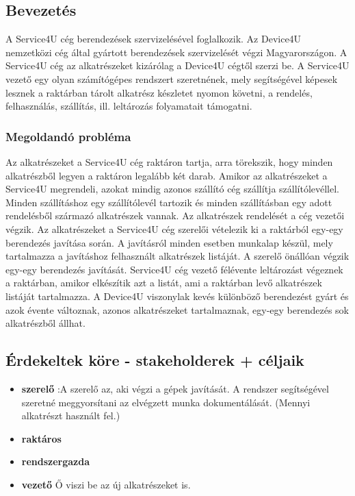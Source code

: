 \documentclass[11pt]{article}\usepackage[left=20mm,right=20mm,top=15mm,bottom=20mm]{geometry}
\begin{document}
\subsection{Bevezetés}
A Service4U cég berendezések szervizelésével foglalkozik. Az Device4U nemzetközi cég által
gyártott berendezések szervizelését végzi Magyarországon. A Service4U cég az alkatrészeket
kizárólag a Device4U cégtől szerzi be.
A Service4U vezető egy olyan számítógépes rendszert szeretnének, mely segítségével képesek
lesznek a raktárban tárolt alkatrész készletet nyomon követni, a rendelés, felhasználás, szállítás, ill.
leltározás folyamatait támogatni.

\subsubsection{Megoldandó probléma}
Az alkatrészeket a Service4U cég raktáron tartja, arra törekszik, hogy minden alkatrészből legyen a
raktáron legalább két darab. Amikor az alkatrészeket a Service4U megrendeli, azokat mindig
azonos szállító cég szállítja szállítólevéllel. Minden szállításhoz egy szállítólevél tartozik és minden
szállításban egy adott rendelésből származó alkatrészek vannak. Az alkatrészek rendelését a cég
vezetői végzik.
Az alkatrészeket a Service4U cég szerelői vételezik ki a raktárból egy-egy berendezés javítása
során. A javításról minden esetben munkalap készül, mely tartalmazza a javításhoz felhasznált
alkatrészek listáját. A szerelő önállóan végzik egy-egy berendezés javítását.
Service4U cég vezető félévente leltározást végeznek a raktárban, amikor elkészítik azt a listát, ami a
raktárban levő alkatrészek listáját tartalmazza.
A Device4U viszonylak kevés különböző berendezést gyárt és azok évente változnak, azonos
alkatrészeket tartalmaznak, egy-egy berendezés sok alkatrészből állhat.

\subsection{Érdekeltek köre - stakeholderek + céljaik}
\begin{itemize}
\item[] \textbf{szerelő} :A szerelő az, aki végzi a gépek javítását. A rendszer segítségével szeretné meggyorsítani az elvégzett munka dokumentálását. (Mennyi alkatrészt használt fel.)
\item[] \textbf{raktáros}
\item[] \textbf{rendszergazda}
\item[] \textbf{vezető} Ő viszi be az új alkatrészeket is.
\end{itemize}
\end{document}
